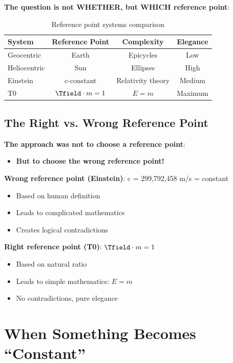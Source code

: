 	\textbf{The question is not WHETHER, but WHICH reference point}:
	
	\begin{table}[htbp]
		\centering
		\begin{tabular}{|l|c|c|c|}
			\hline
			\textbf{System} & \textbf{Reference Point} & \textbf{Complexity} & \textbf{Elegance} \\
			\hline
			Geocentric & Earth & Epicycles & Low \\
			Heliocentric & Sun & Ellipses & High \\
			Einstein & c-constant & Relativity theory & Medium \\
			T0 & $\Tfield \cdot m = 1$ & $E = m$ & Maximum \\
			\hline
		\end{tabular}
		\caption{Reference point systems comparison}
	\end{table}
	
	\subsection{The Right vs. Wrong Reference Point}
	
	\textbf{The approach was not to choose a reference point}:
	\begin{itemize}
		\item \textbf{But to choose the wrong reference point!}
	\end{itemize}
	
	\textbf{Wrong reference point (Einstein)}: c = 299,792,458 m/s = constant
	\begin{itemize}
		\item Based on human definition
		\item Leads to complicated mathematics
		\item Creates logical contradictions
	\end{itemize}
	
	\textbf{Right reference point (T0)}: $\Tfield \cdot m = 1$
	\begin{itemize}
		\item Based on natural ratio
		\item Leads to simple mathematics: $E = m$
		\item No contradictions, pure elegance
	\end{itemize}
	
	\section{When Something Becomes ``Constant''}
	
